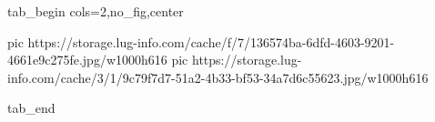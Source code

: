  
 
 
 
 


\ifcmt
  tab_begin cols=2,no_fig,center

     pic https://storage.lug-info.com/cache/f/7/136574ba-6dfd-4603-9201-4661e9c275fe.jpg/w1000h616%
		 pic https://storage.lug-info.com/cache/3/1/9c79f7d7-51a2-4b33-bf53-34a7d6c55623.jpg/w1000h616%

  tab_end
\fi
